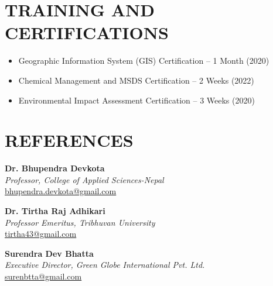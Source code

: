 \documentclass[a4paper,9pt]{extarticle}
\begin{document}
\section*{TRAINING AND CERTIFICATIONS}
\begin{itemize}
    \item Geographic Information System (GIS) Certification – 1 Month (2020)
    \item Chemical Management and MSDS Certification – 2 Weeks (2022)
    \item Environmental Impact Assessment Certification – 3 Weeks (2020)
\end{itemize}

\section*{REFERENCES}
\noindent
\textbf{Dr. Bhupendra Devkota}\\
\textit{Professor, College of Applied Sciences-Nepal}\\
\href{mailto:bhupendra.devkota@gmail.com}{bhupendra.devkota@gmail.com}

\noindent
\textbf{Dr. Tirtha Raj Adhikari}\\
\textit{Professor Emeritus, Tribhuvan University}\\
\href{mailto:tirtha43@gmail.com}{tirtha43@gmail.com}

\noindent
\textbf{Surendra Dev Bhatta}\\
\textit{Executive Director, Green Globe International Pvt. Ltd.}\\
\href{mailto:surenbtta@gmail.com}{surenbtta@gmail.com}
\end{document}
